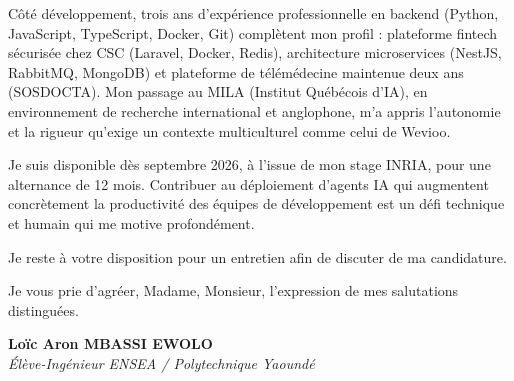 \documentclass[a4paper,11pt]{article}
\begin{document}
Côté développement, trois ans d'expérience professionnelle en backend (Python, JavaScript, TypeScript, Docker, Git) complètent mon profil : plateforme fintech sécurisée chez CSC (Laravel, Docker, Redis), architecture microservices (NestJS, RabbitMQ, MongoDB) et plateforme de télémédecine maintenue deux ans (SOSDOCTA). Mon passage au MILA (Institut Québécois d'IA), en environnement de recherche international et anglophone, m'a appris l'autonomie et la rigueur qu'exige un contexte multiculturel comme celui de Wevioo.

Je suis disponible dès septembre 2026, à l'issue de mon stage INRIA, pour une alternance de 12 mois. Contribuer au déploiement d'agents IA qui augmentent concrètement la productivité des équipes de développement est un défi technique et humain qui me motive profondément.

Je reste à votre disposition pour un entretien afin de discuter de ma candidature.

Je vous prie d'agréer, Madame, Monsieur, l'expression de mes salutations distinguées.

\vspace{0.8cm}

\textbf{Loïc Aron MBASSI EWOLO}\\
\textit{Élève-Ingénieur ENSEA / Polytechnique Yaoundé}
\end{document}
